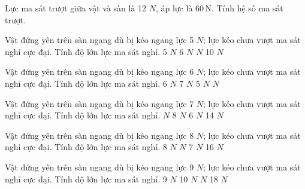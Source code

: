 \begin{bt}
Lực ma sát trượt giữa vật và sàn là 12 $N$, áp lực là $60\,\text{N}$. Tính hệ số ma sát trượt.
\end{bt}

\begin{ex}
Vật đứng yên trên sàn ngang dù bị kéo ngang lực 5 $N$; lực kéo chưa vượt ma sát nghỉ cực đại. Tính độ lớn lực ma sát nghỉ.
\choice
{5 $N$}
{6 $N$}
{ $N$}
{10 $N$}
\end{ex}

\begin{ex}
Vật đứng yên trên sàn ngang dù bị kéo ngang lực 6 $N$; lực kéo chưa vượt ma sát nghỉ cực đại. Tính độ lớn lực ma sát nghỉ.
\choice
{6 $N$}
{7 $N$}
{5 $N$}
{ $N$}
\end{ex}

\begin{ex}
Vật đứng yên trên sàn ngang dù bị kéo ngang lực 7 $N$; lực kéo chưa vượt ma sát nghỉ cực đại. Tính độ lớn lực ma sát nghỉ.
\choice
{ $N$}
{8 $N$}
{6 $N$}
{14 $N$}
\end{ex}

\begin{ex}
Vật đứng yên trên sàn ngang dù bị kéo ngang lực 8 $N$; lực kéo chưa vượt ma sát nghỉ cực đại. Tính độ lớn lực ma sát nghỉ.
\choice
{8 $N$}
{ $N$}
{7 $N$}
{16 $N$}
\end{ex}

\begin{ex}
Vật đứng yên trên sàn ngang dù bị kéo ngang lực 9 $N$; lực kéo chưa vượt ma sát nghỉ cực đại. Tính độ lớn lực ma sát nghỉ.
\choice
{9 $N$}
{10 $N$}
{ $N$}
{18 $N$}
\end{ex}

